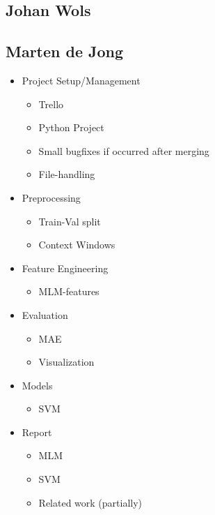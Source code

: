 \documentclass[11pt]{article}
\begin{document}
\subsection{Johan Wols}

\subsection{Marten de Jong}

\begin{itemize}
    \item Project Setup/Management
          \begin{itemize}
              \item Trello
              \item Python Project
              \item Small bugfixes if occurred after merging
              \item File-handling
          \end{itemize}
    \item Preprocessing
          \begin{itemize}
              \item Train-Val split
              \item Context Windows
          \end{itemize}
    \item Feature Engineering
          \begin{itemize}
              \item MLM-features
          \end{itemize}
    \item Evaluation
          \begin{itemize}
              \item MAE
              \item Visualization
          \end{itemize}
    \item Models
          \begin{itemize}
              \item SVM
          \end{itemize}
    \item Report
          \begin{itemize}
              \item MLM
              \item SVM
              \item Related work (partially)
          \end{itemize}
\end{itemize}
\end{document}
